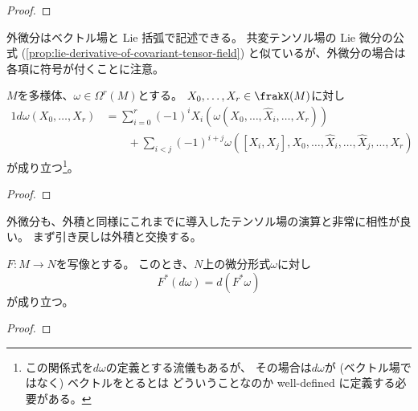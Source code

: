 \documentclass[report]{jlreq}
\begin{document}
\begin{proof}
    \TODO{}
\end{proof}

外微分はベクトル場と Lie 括弧で記述できる。
共変テンソル場の Lie 微分の公式
(\cref{prop:lie-derivative-of-covariant-tensor-field})
と似ているが、外微分の場合は各項に符号が付くことに注意。

\begin{proposition}[外微分とベクトル場の計算公式]
    $M$を多様体、$\omega \in \Omega^r(M)$とする。
    $X_0, \dots, X_r \in \frakX(M)$に対し
    \begin{alignat}{1}
        d\omega(X_0, \dots, X_r)
            &= \sum_{i = 0}^r (-1)^i X_i (\omega(X_0, \dots, \hat{X}_i, \dots, X_r)) \\
            &\qquad + \sum_{i < j} (-1)^{i+j}
                \omega([X_i, X_j], X_0, \dots, \hat{X}_i, \dots, \hat{X}_j, \dots, X_r)
    \end{alignat}
    が成り立つ\footnote{
        この関係式を$d\omega$の定義とする流儀もあるが、
        その場合は$d\omega$が (ベクトル場ではなく) ベクトルをとるとは
        どういうことなのか well-defined に定義する必要がある。
    }。
\end{proposition}


\begin{proof}
    \TODO{}
\end{proof}

外微分も、外積と同様にこれまでに導入したテンソル場の演算と非常に相性が良い。
まず引き戻しは外積と交換する。

\begin{proposition}
    $F \colon M \to N$を{\smooth}写像とする。
    このとき、$N$上の微分形式$\omega$に対し
    \begin{equation}
        F^* (d\omega) = d(F^* \omega)
    \end{equation}
    が成り立つ。
\end{proposition}

\begin{proof}
    \TODO{}
\end{proof}
\end{document}
